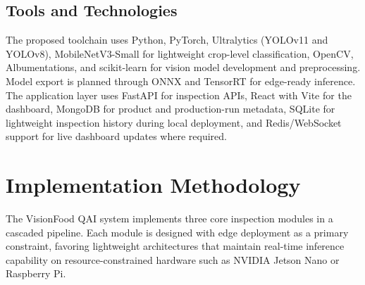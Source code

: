 \documentclass{ieeeaccess}
\begin{document}
\begin{table}[!t]
\caption{Target Performance Benchmarks}
\label{tab:targets}
\centering
{}
\end{table}

\subsection{Tools and Technologies}
The proposed toolchain uses Python, PyTorch, Ultralytics (YOLOv11 and YOLOv8), MobileNetV3-Small for lightweight crop-level classification, OpenCV, Albumentations, and scikit-learn for vision model development and preprocessing. Model export is planned through ONNX and TensorRT for edge-ready inference. The application layer uses FastAPI for inspection APIs, React with Vite for the dashboard, MongoDB for product and production-run metadata, SQLite for lightweight inspection history during local deployment, and Redis/WebSocket support for live dashboard updates where required.


\section{Implementation Methodology}
\label{sec:methodology}

The VisionFood QAI system implements three core inspection modules in a cascaded pipeline. Each module is designed with edge deployment as a primary constraint, favoring lightweight architectures that maintain real-time inference capability on resource-constrained hardware such as NVIDIA Jetson Nano or Raspberry Pi.
\end{document}
